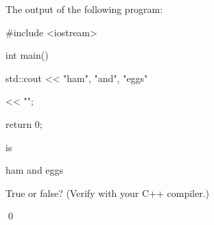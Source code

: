 The output of the following program:

\begin{console}

#include <iostream>



int main()

{

    std::cout << "ham", "and", "eggs"

              << "\n";

      

    return 0;

}

\end{console}

is

\begin{console}

ham and eggs

\end{console}

True or false? (Verify with your C++ compiler.)

\qed

